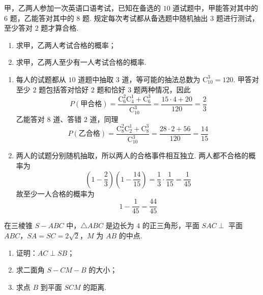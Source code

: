 \begin{problem}
甲，乙两人参加一次英语口语考试，已知在备选的 \(10\) 道试题中，甲能答对其中的 \(6\) 题，乙能答对其中的 \(8\) 题. 规定每次考试都从备选题中随机抽出 \(3\) 题进行测试，至少答对 \(2\) 题才算合格.

\begin{enumerate}
\item 求甲，乙两人考试合格的概率；
\item 求甲，乙两人至少有一人考试合格的概率.
\end{enumerate}
\end{problem}

\begin{solution}
\begin{enumerate}
\item 每人的试题都从 \(10\) 道题中抽取 \(3\) 道，等可能的抽法总数为 \(\mathrm C_{10}^3=120\). 甲答对至少 \(2\) 题包括答对恰好 \(2\) 题和恰好 \(3\) 题两种情况，因此
\[
P(\text{甲合格})
=\frac{\mathrm C_6^2\mathrm C_4^1+\mathrm C_6^3}{\mathrm C_{10}^3}
=\frac{15\cdot4+20}{120}=\frac23
\]
乙能答对 \(8\) 道、答错 \(2\) 道，同理
\[
P(\text{乙合格})
=\frac{\mathrm C_8^2\mathrm C_2^1+\mathrm C_8^3}{\mathrm C_{10}^3}
=\frac{28\cdot2+56}{120}=\frac{14}{15}
\]
\item 两人的试题分别随机抽取，所以两人的合格事件相互独立. 两人都不合格的概率为
\[
\left(1-\frac23\right)\left(1-\frac{14}{15}\right)
=\frac13\cdot\frac1{15}=\frac1{45}
\]
故至少一人合格的概率为
\[
1-\frac1{45}=\frac{44}{45}
\]
\end{enumerate}
\end{solution}

\begin{problem}
在三棱锥 \(S - ABC\) 中，\(\triangle ABC\) 是边长为 \(4\) 的正三角形，平面 \(SAC \perp\) 平面 \(ABC\)，\(SA = SC = 2\sqrt{2}\)，\(M\) 为 \(AB\) 的中点.

\begin{enumerate}
\item 证明：\(AC \perp SB\)；
\item 求二面角 \(S - CM - B\) 的大小；
\item 求点 \(B\) 到平面 \(SCM\) 的距离.
\end{enumerate}

\end{problem}


